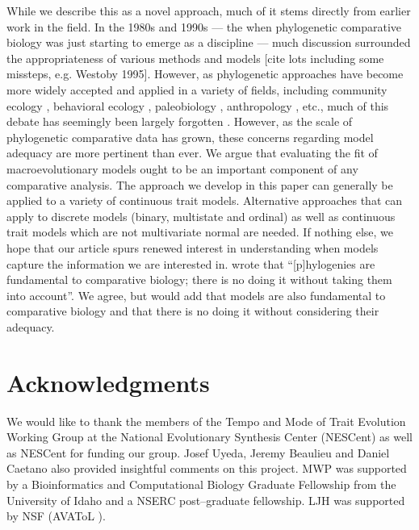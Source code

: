 \documentclass[12pt]{article}
\begin{document}
While we describe this as a novel approach, much of it stems directly from earlier work in the field. In the 1980s and 1990s --- the when phylogenetic comparative biology was just starting to emerge as a discipline --- much discussion surrounded the appropriateness of various methods and models [cite lots including some missteps, e.g. Westoby 1995]. However, as phylogenetic approaches have become more widely accepted and applied in a variety of fields, including community ecology \citep{Green1993, AckerlyDonoghue1995, Webb2002, CB2009, PennellHarmon}, behavioral ecology \citep{something}, paleobiology \citep{something else}, anthropology \citep{Nunnbook}, etc., much of this debate has seemingly been largely forgotten \citep[but see][]{Losos2010}. However, as the scale of phylogenetic comparative data has grown, these concerns regarding model adequacy are more pertinent than ever. We argue that evaluating the fit of macroevolutionary models ought to be an important component of any comparative analysis. The approach we develop in this paper can generally be applied to a variety of continuous trait models. Alternative approaches that can apply to discrete models (binary, multistate and ordinal) as well as continuous trait models which are not multivariate normal are needed. If nothing else, we hope that our article spurs renewed interest in understanding when models capture the information we are interested in. \citet[][p. 14]{Felsenstein1985} wrote that ``[p]hylogenies are fundamental to comparative biology; there is no doing it without taking them into account''. We agree, but would add that models are also fundamental to comparative biology and that there is no doing it without considering their adequacy.


\section*{Acknowledgments}

We would like to thank the members of the Tempo and Mode of Trait Evolution Working Group at the National Evolutionary Synthesis Center (NESCent) as well as NESCent for funding our group. Josef Uyeda, Jeremy Beaulieu and Daniel Caetano also provided insightful comments on this project. MWP was supported by a Bioinformatics and Computational Biology Graduate Fellowship from the University of Idaho and a NSERC post--graduate fellowship. LJH was supported by NSF (AVAToL ).



\newpage


\end{document}
